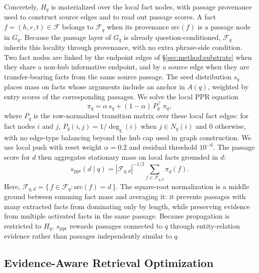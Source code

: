 Concretely, $H_q$ is materialized over the local fact nodes, with
passage provenance used to construct source edges and to read out
passage scores. A fact $f=(h,r,t) \in \mathcal{F}$ belongs to
$\mathcal{F}_q$ when its provenance $\mathrm{src}(f)$ is a passage
node in $G_q$. Because the passage layer of $G_q$ is already
question-conditioned, $\mathcal{F}_q$ inherits this locality through
provenance, with no extra phrase-side condition. Two fact nodes are
linked by the endpoint edges of \S\ref{sec:method:substrate} when they
share a non-hub informative endpoint, and by a source edge when they
are transfer-bearing facts from the same source passage. The seed
distribution $s_q$ places mass on facts whose arguments include an
anchor in $A(q)$, weighted by entry scores of the corresponding
passages. We solve the local PPR equation
\begin{equation}
\label{eq:local-ppr}
\pi_q = \alpha\, s_q + (1-\alpha)\, P_q^{\!\top}\, \pi_q,
\end{equation}
where $P_q$ is the row-normalized transition matrix over these local
fact edges: for fact nodes $i$ and $j$,
$P_q(i,j)=1/\deg_q(i)$ when $j \in N_q(i)$ and $0$ otherwise, with no
edge-type balancing beyond the hub cap used in graph construction. We
use local push with reset weight $\alpha=0.2$ and residual threshold
$10^{-6}$. The passage score for $d$ then aggregates stationary mass
on local facts grounded in $d$:
\begin{equation}
\label{eq:passage-score}
s_{\mathrm{ppr}}(d \mid q)
=
|\mathcal{F}_{q,d}|^{-1/2}
\sum_{f \in \mathcal{F}_{q,d}} \pi_q(f).
\end{equation}
Here,
$\mathcal{F}_{q,d}=\{\,f\in\mathcal{F}_q:\mathrm{src}(f)=d\,\}$.
The square-root normalization is a middle ground between summing fact
mass and averaging it: it prevents passages with many extracted facts
from dominating only by length, while preserving evidence from multiple
activated facts in the same passage. Because propagation is restricted
to $H_q$, $s_{\mathrm{ppr}}$ rewards passages connected to $q$ through
entity-relation evidence rather than passages independently similar to
$q$.

\subsection{Evidence-Aware Retrieval Optimization}
\label{sec:method:enhancement}

